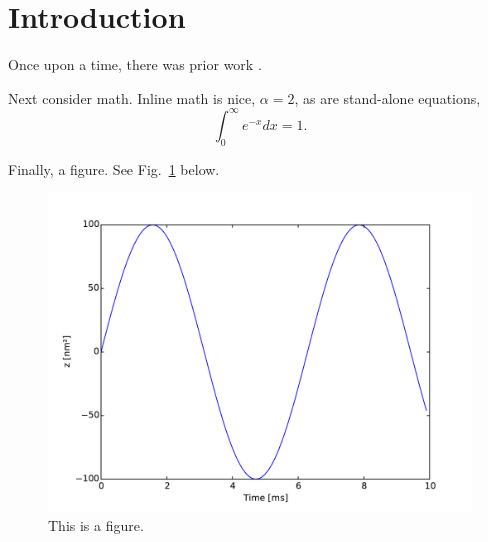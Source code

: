 \documentclass{article}
\begin{document}
\section*{Introduction}

\noindent Once upon a time, there was prior work \cite{Ernst1987,Rugar2004jul,Isaac2016apr,Isaac2018jan}. 

Next consider math.  Inline math is nice, $\alpha = 2$, as are stand-alone equations,
\begin{equation}
\int_0^{\infty} e^{-x} dx = 1.
\end{equation}

Finally, a figure.  See Fig.~\ref{fig:sine} below.




\newpage

\begin{figure}
\centering
\includegraphics[width=6.50in]{figs/ex.pdf}
\caption{This is a figure.}
\label{fig:sine}
\end{figure}
\end{document}
